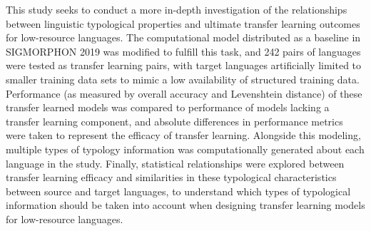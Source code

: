This study seeks to conduct a more in-depth investigation of the relationships between linguistic typological properties and ultimate transfer learning outcomes for low-resource languages. The computational model distributed as a baseline in SIGMORPHON 2019 was modified to fulfill this task, and 242 pairs of languages were tested as transfer learning pairs, with target languages artificially limited to smaller training data sets to mimic a low availability of structured training data. Performance (as measured by overall accuracy and Levenshtein distance) of these transfer learned models was compared to performance of models lacking a transfer learning component, and absolute differences in performance metrics were taken to represent the efficacy of transfer learning. Alongside this modeling, multiple types of typology information was computationally generated about each language in the study. Finally, statistical relationships were explored between transfer learning efficacy and similarities in these typological characteristics between source and target languages, to understand which types of typological information should be taken into account when designing transfer learning models for low-resource languages.